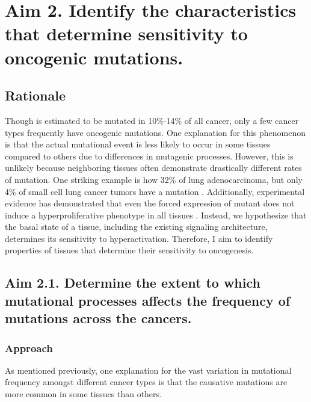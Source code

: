 \section{Aim 2. Identify the characteristics that determine sensitivity to oncogenic \KRAS{} mutations.}

\subsection*{Rationale}

Though \KRAS{} is estimated to be mutated in 10\%-14\% \cite{Bailey2018, Prior2020TheCancer} of all cancer, only a few cancer types frequently have oncogenic \KRAS{} mutations.
One explanation for this phenomenon is that the actual mutational event is less likely to occur in some tissues compared to others due to differences in mutagenic processes.
However, this is unlikely because neighboring tissues often demonstrate drastically different rates of \KRAS{} mutation.
One striking example is how 32\% of lung adenocarcinoma, but only 4\% of small cell lung cancer tumors have a \KRAS{} mutation \cite{Bailey2018, Prior2020TheCancer}.
Additionally, experimental evidence has demonstrated that even the forced expression of mutant \kras{} does not induce a hyperproliferative phenotype in all tissues \cite{Ray2011EpithelialModel,  Parikh2012MouseResponses}.
Instead, we hypothesize that the basal state of a tissue, including the existing signaling architecture, determines its sensitivity to \KRAS{} hyperactivation.
Therefore, I aim to identify properties of tissues that determine their sensitivity to \KRAS{} oncogenesis.


\subsection*{Aim 2.1. Determine the extent to which mutational processes affects the frequency of \KRAS{} mutations across the cancers.}

\subsubsection*{Approach}

As mentioned previously, one explanation for the vast variation in \KRAS{} mutational frequency amongst different cancer types is that the causative mutations are more common in some tissues than others.


